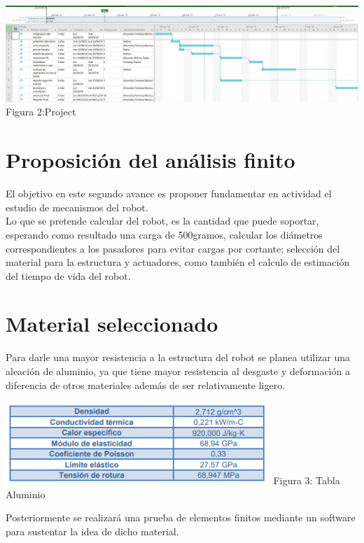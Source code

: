 \documentclass[12pt,a4paper]{report}
\begin{document}
\begin{center}
\includegraphics[width=18cm]{Project.png}
   Figura 2:Project
    
\end{center}



\section{Proposición del análisis finito}
El objetivo en este segundo avance es proponer fundamentar en actividad el estudio de mecanismos del robot.\\
Lo que se pretende calcular del robot, es la cantidad que puede soportar, esperando como resultado una carga de 500gramos, calcular los diámetros correspondientes a los pasadores para evitar cargas por cortante; selección del material para la estructura y actuadores, como también el calculo de estimación del tiempo de vida del robot.\\

\section{Material seleccionado}

Para darle una mayor resistencia a la estructura del robot se planea utilizar una aleación de aluminio, ya que tiene mayor resistencia al desgaste y deformación a diferencia de otros materiales además de ser relativamente ligero.\\


\begin{center}
\includegraphics[width=10cm]{tablaaluminio.png}
 Figura 3: Tabla Aluminio
\end{center}
Posteriormente se realizará una prueba de elementos finitos mediante un software para sustentar la idea de dicho material.\\
\end{document}
